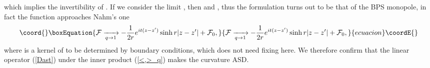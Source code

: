 \documentclass[a4paper,10pt]{article}
\begin{document}
which implies the invertibility of \myHighlight{$\Delta^*\Delta$}\coordHE{}.
If we consider the limit \coordHE{}, then \coordHE{} and \coordHE{}, thus the formulation turns out to be that of the BPS monopole, in fact the function \coordHE{} approaches Nahm's one \cite{Nahm80}
\begin{equation}\coord{}\boxEquation{
\mathcal{F} \xrightarrow [q\to1]{}-\frac{1}{2r}e^{it(z-z')}\sinh r|z-z'|+\mathcal{F}_0,
}{
\mathcal{F} \xrightarrow [q\to1]{}-\frac{1}{2r}e^{it(z-z')}\sinh r|z-z'|+\mathcal{F}_0,
}{ecuacion}\coordE{}\end{equation}
where \coordHE{} is a kernel of \myHighlight{$\Delta^*\Delta$}\coordHE{} to be determined by boundary conditions, which does not need fixing here.
We therefore confirm that the linear operator (\ref{Dast}) under the inner product (\ref{<,>_q}) makes the curvature ASD.
\end{document}
